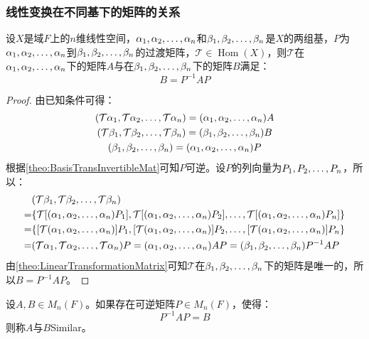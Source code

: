 \subsubsection{线性变换在不同基下的矩阵的关系}
\begin{theorem}\label{theo:LinearTransformationMatrixSimilarity}
	设$X$是域$F$上的$n$维线性空间，$\alpha_1, \alpha_2, \dots, \alpha_{n}$和$\beta_1, \beta_2, \dots, \beta_{n}$是$X$的两组基，$P$为$\alpha_1, \alpha_2, \dots, \alpha_{n}$到$\beta_1, \beta_2, \dots, \beta_{n}$的过渡矩阵，$\mathcal{T}\in\operatorname{Hom}(X)$，则$\mathcal{T}$在$\alpha_1, \alpha_2, \dots, \alpha_{n}$下的矩阵$A$与在$\beta_1, \beta_2, \dots, \beta_{n}$下的矩阵$B$满足：
	\begin{equation*}
		B=P^{-1}AP
	\end{equation*}
\end{theorem}
\begin{proof}
	由已知条件可得：
	\begin{gather*}
		(\mathcal{T}\alpha_1, \mathcal{T}\alpha_2, \dots, \mathcal{T}\alpha_{n})=(\alpha_1, \alpha_2, \dots, \alpha_{n})A \\
		(\mathcal{T}\beta_1, \mathcal{T}\beta_2, \dots, \mathcal{T}\beta_{n})=(\beta_1, \beta_2, \dots, \beta_{n})B \\
		(\beta_1, \beta_2, \dots, \beta_{n})=(\alpha_1, \alpha_2, \dots, \alpha_{n})P
	\end{gather*}
	根据\cref{theo:BasisTransInvertibleMat}可知$P$可逆。设$P$的列向量为$P_1, P_2, \dots, P_{n}$，所以：
	\begin{align*}
		&(\mathcal{T}\beta_1, \mathcal{T}\beta_2, \dots, \mathcal{T}\beta_{n}) \\
		=&\{\mathcal{T}[(\alpha_1, \alpha_2, \dots, \alpha_{n})P_1],\mathcal{T}[(\alpha_1, \alpha_2, \dots, \alpha_{n})P_2],\dots,\mathcal{T}[(\alpha_1, \alpha_2, \dots, \alpha_{n})P_n]\} \\
		=&\{[\mathcal{T}(\alpha_1, \alpha_2, \dots, \alpha_{n})]P_1,[\mathcal{T}(\alpha_1, \alpha_2, \dots, \alpha_{n})]P_2,\dots,[\mathcal{T}(\alpha_1, \alpha_2, \dots, \alpha_{n})]P_n\} \\
		=&(\mathcal{T}\alpha_1, \mathcal{T}\alpha_2, \dots, \mathcal{T}\alpha_{n})P 
		=(\alpha_1, \alpha_2, \dots, \alpha_{n})AP
		=(\beta_1, \beta_2, \dots, \beta_{n})P^{-1}AP
	\end{align*}
	由\cref{theo:LinearTransformationMatrix}可知$\mathcal{T}$在$\beta_1, \beta_2, \dots, \beta_{n}$下的矩阵是唯一的，所以$B=P^{-1}AP$。
\end{proof}
\begin{definition}
	设$A,B\in M_{n}(F)$。如果存在可逆矩阵$P\in M_{n}(F)$，使得：
	\begin{equation*}
		P^{-1}AP=B
	\end{equation*}
	则称$A$与$B$\gls{Similar}。
\end{definition}

